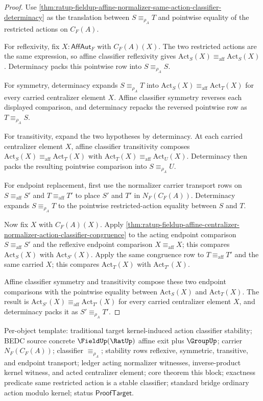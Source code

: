\begin{proof}
Use
\autoref{thm:ratup-fieldup-affine-normalizer-same-action-classifier-determinacy}
as the translation between $S\equiv_{\rho_A}T$ and pointwise equality of the
restricted actions on $C_F(A)$.

For reflexivity, fix $X:\mathsf{AffAut}_F$ with $C_F(A)(X)$. The two restricted
actions are the same expression, so affine classifier reflexivity gives
$\mathrm{Act}_S(X)\equiv_{\mathrm{aff}}\mathrm{Act}_S(X)$. Determinacy packs
this pointwise row into $S\equiv_{\rho_A}S$.

For symmetry, determinacy expands $S\equiv_{\rho_A}T$ into
$\mathrm{Act}_S(X)\equiv_{\mathrm{aff}}\mathrm{Act}_T(X)$ for every carried
centralizer element $X$. Affine classifier symmetry reverses each displayed
comparison, and determinacy repacks the reversed pointwise row as
$T\equiv_{\rho_A}S$.

For transitivity, expand the two hypotheses by determinacy. At each carried
centralizer element $X$, affine classifier transitivity composes
$\mathrm{Act}_S(X)\equiv_{\mathrm{aff}}\mathrm{Act}_T(X)$ with
$\mathrm{Act}_T(X)\equiv_{\mathrm{aff}}\mathrm{Act}_U(X)$. Determinacy then
packs the resulting pointwise comparison into $S\equiv_{\rho_A}U$.

For endpoint replacement, first use the normalizer carrier transport rows on
$S\equiv_{\mathrm{aff}}S'$ and $T\equiv_{\mathrm{aff}}T'$ to place $S'$ and
$T'$ in $N_F(C_F(A))$. Determinacy expands $S\equiv_{\rho_A}T$ to the pointwise
restricted-action equality between $S$ and $T$.

Now fix $X$ with $C_F(A)(X)$. Apply
\autoref{thm:ratup-fieldup-affine-centralizer-normalizer-action-classifier-congruence}
to the acting endpoint comparison $S\equiv_{\mathrm{aff}}S'$ and the reflexive
endpoint comparison $X\equiv_{\mathrm{aff}}X$; this compares
$\mathrm{Act}_S(X)$ with $\mathrm{Act}_{S'}(X)$. Apply the same congruence row
to $T\equiv_{\mathrm{aff}}T'$ and the same carried $X$; this compares
$\mathrm{Act}_T(X)$ with $\mathrm{Act}_{T'}(X)$.

Affine classifier symmetry and transitivity compose these two endpoint
comparisons with the pointwise equality between $\mathrm{Act}_S(X)$ and
$\mathrm{Act}_T(X)$. The result is
$\mathrm{Act}_{S'}(X)\equiv_{\mathrm{aff}}\mathrm{Act}_{T'}(X)$ for every
carried centralizer element $X$, and determinacy packs it as
$S'\equiv_{\rho_A}T'$.
\end{proof}

Per-object template: traditional target kernel-induced action classifier
stability; BEDC source concrete $\FieldUp(\RatUp)$ affine exit plus
$\GroupUp$; carrier $N_F(C_F(A))$; classifier $\equiv_{\rho_A}$; stability
rows reflexive, symmetric, transitive, and endpoint transport; ledger acting
normalizer witnesses, inverse-product kernel witness, and acted centralizer
element; core theorem this block; exactness predicate same restricted action is
a stable classifier; standard bridge ordinary action modulo kernel; status
$\mathsf{ProofTarget}$.

